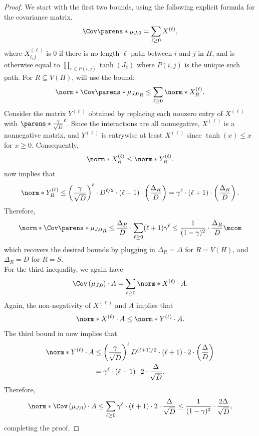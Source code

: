 \documentclass[11pt,letterpaper]{article}
\begin{document}
    \begin{proof}
        We start with the first two bounds, using the following explicit formula for the covariance matrix.
        \[
            \Cov\parens*{\mu_{J,0}} = \sum_{\ell\ge 0} X^{(\ell)},
        \]
        where $X^{(\ell)}_{i,j}$ is $0$ if there is no length-$\ell$ path between $i$ and $j$ in $H$, and is otherwise equal to $\prod_{e\in P(i,j)} \tanh(J_e)$ where $P(i,j)$ is the unique such path.
        For $R\subseteq V(H)$, will use the bound:
        \begin{equation}
            \label{eq:trace-moment-cov-bound-ez}
            \norm*{\Cov\parens*{\mu_{J,0}}_R} \le \sum_{\ell\ge 0} \norm*{X^{(\ell)}_R}.
        \end{equation}
        Consider the matrix $Y^{(\ell)}$ obtained by replacing each nonzero entry of $X^{(\ell)}$ with $\parens*{\frac{\gamma}{\sqrt{D}}}^{\ell}$.
        Since the interactions are all nonnegative, $X^{(\ell)}$ is a nonnegative matrix, and $Y^{(\ell)}$ is entrywise at least $X^{(\ell)}$ since $\tanh(x) \le x$ for $x \ge 0$. 
        Consequently,
        \begin{equation}
            \label{eq:trace-moment-termwise-bound-ez}
            \norm*{X^{(\ell)}_R} \le \norm*{Y^{(\ell)}_R}.
        \end{equation}
         now implies that
        \[ \norm*{Y^{(\ell)}_R} \le \left( \frac{\gamma}{\sqrt{D}} \right)^{\ell} \cdot D^{\ell/2} \cdot (\ell+1) \cdot \left(\frac{\Delta_R}{D}\right) = \gamma^{\ell} \cdot (\ell+1) \cdot \left(\frac{\Delta_R}{D}\right). \]
        Therefore,
        \[
            \norm*{\Cov\parens*{\mu_{J,0}}_R} \le \frac{\Delta_R}{D} \cdot \sum_{\ell \ge 0} (\ell+1) \gamma^{\ell} \le \frac{1}{(1-\gamma)^2}\cdot\frac{\Delta_R}{D}\mcom
        \]
        which recovers the desired bounds by plugging in $\Delta_R = \Delta$ for $R = V(H)$, and $\Delta_R = D$ for $R=S$.\\

        For the third inequality, we again have
        \[ \Cov\left(\mu_{J,0}\right)\cdot A = \sum_{\ell \ge 0} \norm*{X^{(\ell)} \cdot A}. \]
        Again, the non-negativity of $X^{(\ell)}$ and $A$ implies that 
        \[ \norm*{X^{(\ell)} \cdot A} \le \norm*{Y^{(\ell)} \cdot A}. \]
        The third bound in  now implies that
        \begin{align*}
            \norm*{Y^{(\ell)} \cdot A} &\le \left(\frac{\gamma}{\sqrt{D}}\right)^{\ell} D^{(\ell+1)/2} \cdot (\ell+1) \cdot 2 \cdot \left( \frac{\Delta}{D} \right) \\
                &= \gamma^{\ell} \cdot (\ell+1) \cdot 2 \cdot \frac{\Delta}{\sqrt{D}}.
        \end{align*}
        Therefore,
        \[ \norm*{\Cov\left(\mu_{J,0}\right) \cdot A} \le \sum_{\ell \ge 0} \gamma^{\ell} \cdot (\ell+1) \cdot 2 \cdot \frac{\Delta}{\sqrt{D}} \le \frac{1}{(1-\gamma)^2} \cdot \frac{2\Delta}{\sqrt{D}}, \]
        completing the proof.
    \end{proof}
\end{document}
